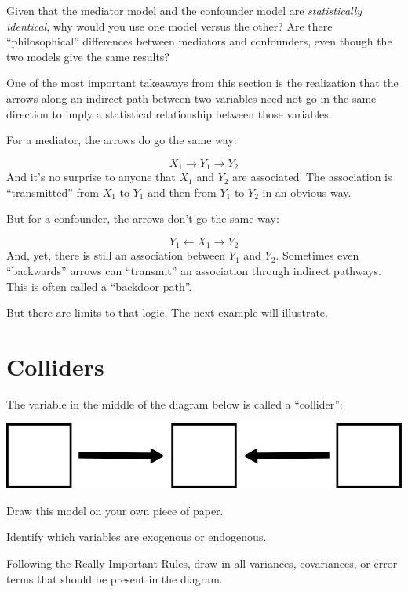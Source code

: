 \documentclass[
]{book}
\begin{document}
Given that the mediator model and the confounder model are \emph{statistically identical}, why would you use one model versus the other? Are there ``philosophical'' differences between mediators and confounders, even though the two models give the same results?

One of the most important takeaways from this section is the realization that the arrows along an indirect path between two variables need not go in the same direction to imply a statistical relationship between those variables.

For a mediator, the arrows do go the same way:

\[
X_{1} \boldsymbol{\rightarrow} Y_{1} \boldsymbol{\rightarrow} Y_{2}
\]
And it's no surprise to anyone that \(X_{1}\) and \(Y_{2}\) are associated. The association is ``transmitted'' from \(X_{1}\) to \(Y_{1}\) and then from \(Y_{1}\) to \(Y_{2}\) in an obvious way.

But for a confounder, the arrows don't go the same way:

\[
Y_{1} \boldsymbol{\leftarrow} X_{1} \boldsymbol{\rightarrow} Y_{2}
\]
And, yet, there is still an association between \(Y_{1}\) and \(Y_{2}\). Sometimes even ``backwards'' arrows can ``transmit'' an association through indirect pathways. This is often called a ``backdoor path''.

But there are limits to that logic. The next example will illustrate.

\hypertarget{mediation-colliders}{%
\section{Colliders}\label{mediation-colliders}}

The variable in the middle of the diagram below is called a ``collider'':

\begin{center}\includegraphics{graphics/collider} \end{center}

Draw this model on your own piece of paper.

Identify which variables are exogenous or endogenous.

Following the Really Important Rules, draw in all variances, covariances, or error terms that should be present in the diagram.
\end{document}
